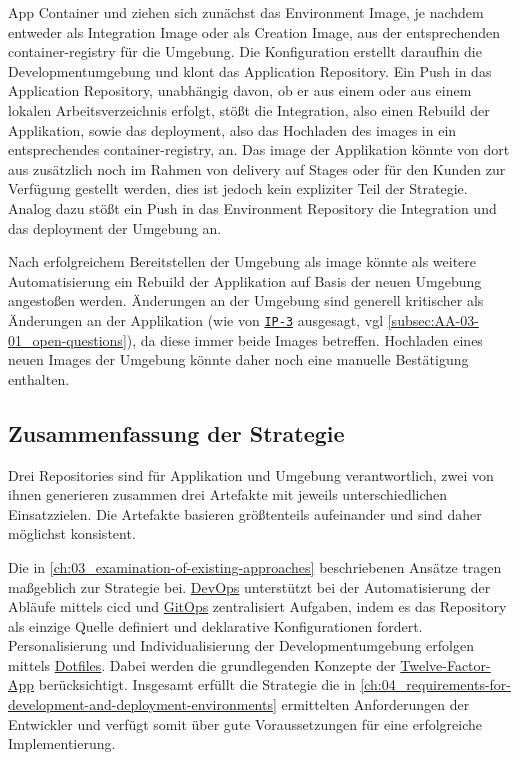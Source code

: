 App Container und  ziehen sich zunächst das Environment Image, je nachdem entweder als Integration Image oder als Creation Image, aus der entsprechenden \Gls{container-registry} für die Umgebung. Die  Konfiguration erstellt daraufhin die Developmentumgebung und klont das Application Repository. Ein Push in das Application Repository, unabhängig davon, ob er aus einem  oder aus einem lokalen Arbeitsverzeichnis erfolgt, stößt die Integration, also einen Rebuild der Applikation, sowie das \Gls{deployment}, also das Hochladen des \Glspl{image} in ein entsprechendes \Gls{container-registry}, an. Das \Gls{image} der Applikation könnte von dort aus zusätzlich noch im Rahmen von \Gls{delivery} auf Stages oder für den Kunden zur Verfügung gestellt werden, dies ist jedoch kein expliziter Teil der  Strategie. Analog dazu stößt ein Push in das Environment Repository die Integration und das \Gls{deployment} der Umgebung an.

Nach erfolgreichem Bereitstellen der Umgebung als \Gls{image} könnte als weitere Automatisierung ein Rebuild der Applikation auf Basis der neuen Umgebung angestoßen werden. Änderungen an der Umgebung sind generell kritischer als Änderungen an der Applikation (wie von \texttt{\hyperref[sec:AA-02_interview-persons]{IP-3}} ausgesagt, \acrshort{vgl} \autoref{subsec:AA-03-01_open-questions}), da diese immer beide Images betreffen. Hochladen eines neuen Images der Umgebung könnte daher noch eine manuelle Bestätigung enthalten. 

\subsection{Zusammenfassung der Strategie}
\label{subsec:05-02-04_summary-of-strategy}

Drei Repositories sind für Applikation und Umgebung verantwortlich, zwei von ihnen generieren zusammen drei Artefakte mit jeweils unterschiedlichen Einsatzzielen. Die Artefakte basieren größtenteils aufeinander und sind daher möglichst konsistent.

Die in \autoref{ch:03_examination-of-existing-approaches} beschriebenen Ansätze tragen maßgeblich zur  Strategie bei. \hyperref[sec:03-01_introduction-to-devops]{DevOps} unterstützt bei der Automatisierung der Abläufe mittels \Gls{cicd} und \hyperref[sec:03-03_gitops-as-further-evolution]{GitOps} zentralisiert Aufgaben, indem es das Repository als einzige Quelle definiert und deklarative Konfigurationen fordert. Personalisierung und Individualisierung der Developmentumgebung erfolgen mittels \hyperref[sec:03-04_idea-of-dotfiles]{Dotfiles}. Dabei werden die grundlegenden Konzepte der \hyperref[sec:03-05_basic-idea-of-twelve-factor-app]{Twelve-Factor-App} berücksichtigt. Insgesamt erfüllt die Strategie die in \autoref{ch:04_requirements-for-development-and-deployment-environments} ermittelten Anforderungen der Entwickler und verfügt somit über gute Voraussetzungen für eine erfolgreiche Implementierung.

